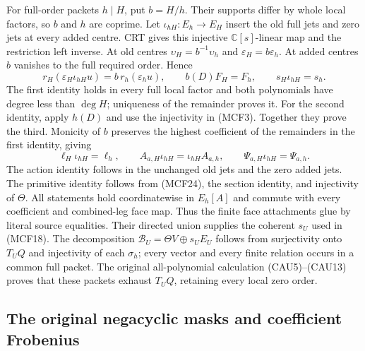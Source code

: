 \documentclass[11pt,a4paper]{article}
\begin{document}
For full-order packets $h\mid H$, put $b=H/h$.  Their supports differ by
whole local factors, so $b$ and $h$ are coprime.  Let
$\iota_{hH}:E_h\to E_H$ insert the old full jets and zero jets at every
added centre.  CRT gives this injective $\mathbb C[s]$-linear map and
the restriction left inverse.  At old centres $\upsilon_H=b^{-1}\upsilon_h$
and $\varepsilon_H=b\varepsilon_h$.  At added centres $b$ vanishes to
the full required order.  Hence
\[
r_H(\varepsilon_H\iota_{hH}u)=b\,r_h(\varepsilon_hu),\qquad
b(D)F_H=F_h,\qquad s_H\iota_{hH}=s_h.
\tag{MCF26}
\]
The first identity holds in every full local factor and both polynomials
have degree less than $\deg H$; uniqueness of the remainder proves it.
For the second identity, apply $h(D)$ and use the injectivity in (MCF3).
Together they prove the third.  Monicity of $b$ preserves the highest
coefficient of the remainders in the first identity, giving
\[
\ell_H\iota_{hH}=\ell_h,\qquad
A_{a,H}\iota_{hH}=\iota_{hH}A_{a,h},\qquad
\Psi_{a,H}\iota_{hH}=\Psi_{a,h}.
\tag{MCF27}
\]
The action identity follows in the unchanged old jets and the zero added
jets.  The primitive identity follows from (MCF24), the section identity,
and injectivity of $\Theta$.  All statements hold coordinatewise in
$E_h[A]$ and commute with every coefficient and combined-leg face map.
Thus the finite face attachments glue by literal source equalities.
Their directed union supplies the coherent $s_U$ used in (MCF18).
The decomposition $\mathscr B_U=\Theta V\oplus s_UE_U$ follows from
surjectivity onto $T_UQ$ and injectivity of each $\sigma_h$; every vector
and every finite relation occurs in a common full packet.  The original
all-polynomial calculation (CAU5)--(CAU13) proves that these packets
exhaust $T_UQ$, retaining every local zero order.

\subsection{The original negacyclic masks and coefficient Frobenius}
\end{document}
